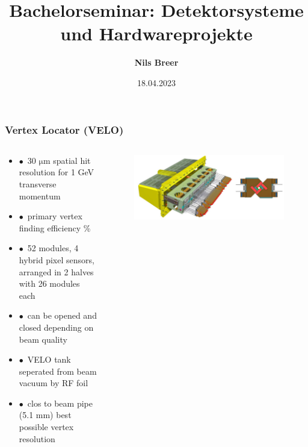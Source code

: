 \documentclass[aspectratio=1610, 12pt, xcolor=dvipsnames]{beamer}
\title{Bachelorseminar: Detektorsysteme und Hardwareprojekte}
\author[N.Breer]{\textbf{Nils Breer}}
\institute{TU Dortmund}
\date{18.04.2023}
\begin{document}
\maketitle

\begin{frame}\frametitle{Vertex Locator (VELO)}
  \begin{columns}
    \begin{column}[c]{0.48\textwidth}
      \begin{itemize}
        \item $\bullet$\, 30 $\si{\micro\metre}$ spatial hit resolution for 1 GeV transverse momentum
        \item $\bullet$\, primary vertex finding efficiency \%
        \item $\bullet$\, 52 modules, 4 hybrid pixel sensors, arranged in 2 halves with 26 modules each
        \item $\bullet$\, can be opened and closed depending on beam quality
        \item $\bullet$\, VELO tank seperated from beam vacuum by RF foil
        \item $\bullet$\, clos to beam pipe (5.1 mm) \to best possible vertex resolution
      \end{itemize}
    \end{column}
    \begin{column}[c]{0.48\textwidth}
      \begin{figure}
        \centering
        \includegraphics[width=\textwidth]{plots/velo.png}
      \end{figure}
    \end{column}
  \end{columns}
\end{frame}
\end{document}
